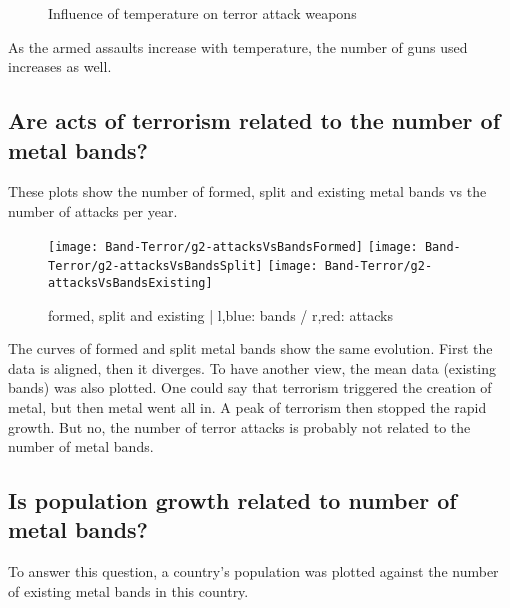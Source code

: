 \newpage

\begin{figure}[!ht]
\centering
    \qquad
    \qquad
    \qquad
    \qquad
    \qquad
\caption{Influence of temperature on terror attack weapons}
\label{fig:example subfigure}
\end{figure}

As the armed assaults increase with temperature, the number of guns used increases as well.


\subsection{Are acts of terrorism related to the number of metal bands?}
These plots show the number of formed, split and existing metal bands vs the number of attacks per year.

\begin{figure}[hbt!]
	\texttt{[image: Band-Terror/g2-attacksVsBandsFormed]}
	\centering
	\texttt{[image: Band-Terror/g2-attacksVsBandsSplit]}
	\texttt{[image: Band-Terror/g2-attacksVsBandsExisting]}
	\caption{formed, split and existing | l,blue: bands / r,red: attacks}
\end{figure}

The curves of formed and split metal bands show the same evolution. First the data is aligned, then it diverges. To have another view, the mean data (existing bands) was also plotted. One could say that terrorism triggered the creation of metal, but then metal went all in. A peak of terrorism then stopped the rapid growth. But no, the number of terror attacks is probably not related to the number of metal bands.


\subsection{Is population growth related to number of metal bands?}
To answer this question, a country's population was plotted against the number of existing metal bands in this country.

